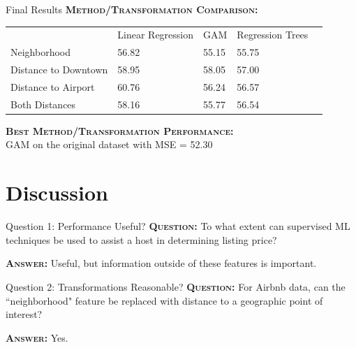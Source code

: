 \documentclass[10pt]{beamer}
\begin{document}
	\begin{frame}{Final Results}
    	\textbf{\textsc{Method/Transformation Comparison:}}
    	\begin{table}[H]
              \centering
              \label{my-label}
              \begin{tabular}{l|llll}
                                     & Linear Regression & GAM & Regression Trees &  \\ \cline{1-4}
                Neighborhood         & 56.82             &  55.15   &    55.75     &  \\
                Distance to Downtown & 58.95             &  58.05   &    57.00   &  \\
                Distance to Airport  & 60.76             &  56.24   &    56.57   &  \\
                Both Distances       & 58.16             &  55.77   &    56.54     & 
              \end{tabular}
            \end{table}
            
        \textbf{\textsc{Best Method/Transformation Performance:}} \\
        GAM on the original dataset with MSE = 52.30
        
    \end{frame}
    


\section{Discussion}
	\begin{frame}{Question 1: Performance Useful?}
    	\textbf{\textsc{Question:}} To what extent can supervised ML techniques be used to assist a host in determining listing price?
        
        \textbf{\textsc{Answer:}} Useful, but information outside of these features is important.
        
    \end{frame}
    
    \begin{frame}{Question 2: Transformations Reasonable?}
    	\textbf{\textsc{Question:}} For Airbnb data, can the ``neighborhood" feature be replaced with distance to a geographic point of interest?
        
        \textbf{\textsc{Answer:}} Yes.
        
    \end{frame}
    
\end{document}
